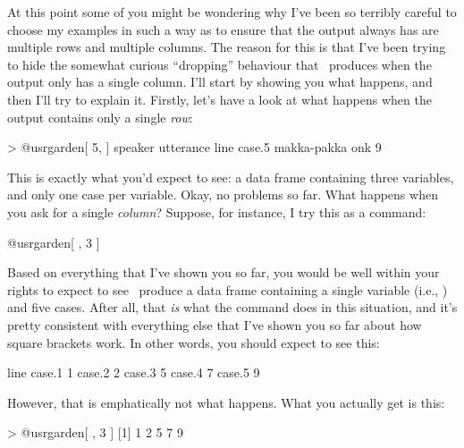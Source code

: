 At this point some of you might be wondering why I've been so terribly careful to choose my examples in such a way as to ensure that the output always has are multiple rows and multiple columns. The reason for this is that I've been trying to hide the somewhat curious ``dropping'' behaviour that \R\ produces when the output only has a single column. I'll start by showing you what happens, and then I'll try to explain it. Firstly, let's have a look at what happens when the output contains only a single {\it row}:
\begin{rblock1}
> @usr{garden[ 5, ]}
           speaker utterance line
case.5 makka-pakka       onk    9
\end{rblock1}
This is exactly what you'd expect to see: a data frame containing three variables, and only one case per variable. Okay, no problems so far. What happens when you ask for a single {\it column}? Suppose, for instance, I try this as a command:
\begin{rblock1}
@usr{garden[ , 3 ]}
\end{rblock1}
Based on everything that I've shown you so far, you would be well within your rights to expect to see \R\ produce a data frame containing a single variable (i.e., ) and five cases. After all, that {\it is} what the  command does in this situation, and it's pretty consistent with everything else that I've shown you so far about how square brackets work. In other words, you should expect to see this:
\begin{rblock1}
       line
case.1    1
case.2    2
case.3    5
case.4    7
case.5    9
\end{rblock1}
However, that is emphatically not what happens. What you actually get is this:
\begin{rblock1}
> @usr{garden[ , 3 ]}
[1] 1 2 5 7 9
\end{rblock1}
